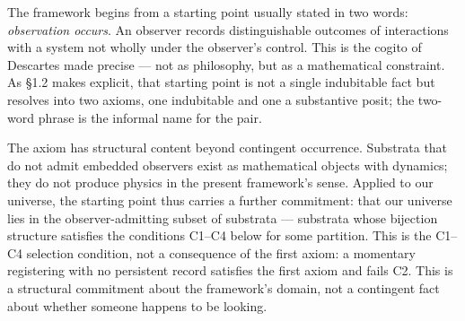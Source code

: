 \documentclass[
]{article}
\begin{document}
The framework begins from a starting point usually stated in two words:
\emph{observation occurs}. An observer records distinguishable outcomes
of interactions with a system not wholly under the observer's control.
This is the cogito of Descartes made precise --- not as philosophy, but
as a mathematical constraint. As §1.2 makes explicit, that starting
point is not a single indubitable fact but resolves into two axioms, one
indubitable and one a substantive posit; the two-word phrase is the
informal name for the pair.

The axiom has structural content beyond contingent occurrence. Substrata
that do not admit embedded observers exist as mathematical objects with
dynamics; they do not produce physics in the present framework's sense.
Applied to our universe, the starting point thus carries a further
commitment: that our universe lies in the observer-admitting subset of
substrata --- substrata whose bijection structure satisfies the
conditions C1--C4 below for some partition. This is the C1--C4 selection
condition, not a consequence of the first axiom: a momentary registering
with no persistent record satisfies the first axiom and fails C2. This
is a structural commitment about the framework's domain, not a
contingent fact about whether someone happens to be looking.
\end{document}
